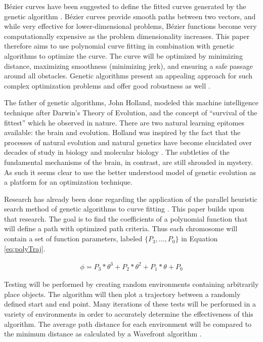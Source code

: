 B\'{e}zier curves have been suggested to define the fitted curves generated by the genetic algorithm \cite{choi10}. B\'{e}zier curves provide smooth paths between two vectors, and while very effective for lower-dimensional problems, B\'{e}zier functions become very computationally expensive as the problem dimensionality increases. This paper therefore aims to use polynomial curve fitting in combination with genetic algorithms to optimize the curve. The curve will be optimized by minimizing distance, maximizing smoothness (minimizing jerk), and ensuring a safe passage around all obstacles. Genetic algorithms present an appealing approach for such complex optimization problems and offer good robustness as well \cite{zou12}.

The father of genetic algorithms, John Holland, modeled this machine intelligence technique after Darwin's Theory of Evolution, and the concept of ``survival of the fittest'' which he observed in nature. There are two natural learning epitomes available: the brain and evolution. Holland was inspired by the fact that the processes of natural evolution and natural genetics have become elucidated over decades of study in biology and molecular biology \cite{goldberg88}. The subtleties of the fundamental mechanisms of the brain, in contrast, are still shrouded in mystery. As such it seems clear to use the better understood model of genetic evolution as a platform for an optimization technique.

Research has already been done regarding the application of the parallel heuristic search method of genetic algorithms to curve fitting \cite{gulsen95,karr91,ismail08}. This paper builds upon that research. The goal is to find the coefficients of a polynomial function that will define a path with optimized path criteria. Thus each chromosome will contain a set of function parameters, labeled $\{P_3, \ldots, P_0\}$ in Equation \ref{eq:polyTraj}.

\begin{align} \label{eq:polyTraj}
	\phi = P_3*\theta^3 + P_2*\theta^2 + P_1*\theta + P_0
\end{align}

Testing will be performed by creating random environments containing arbitrarily place objects. The algorithm will then plot a trajectory between a randomly defined start and end point. Many iterations of these tests will be performed in a variety of environments in order to accurately determine the effectiveness of this algorithm. The average path distance for each environment will be compared to the minimum distance as calculated by a Wavefront algorithm \cite{waslanderI}.

